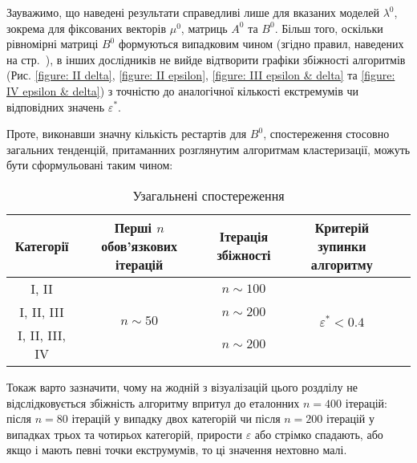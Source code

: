 Зауважимо, що наведені результати справедливі лише для вказаних моделей $\lambda^0$, зокрема для фіксованих векторів $\mu^0$, матриць $A^0$ та $B^0$. Більш того, оскільки рівномірні матриці $B^0$ формуються випадковим чином (згідно правил, наведених на стр.~\pageref{section: II classes}), в інших дослідників не вийде відтворити графіки збіжності алгоритмів (Рис. \ref{figure: II delta}, \ref{figure: II epsilon}, \ref{figure: III epsilon & delta} та \ref{figure: IV epsilon & delta}) з точністю до аналогічної кількості екстремумів чи  відповідних значень $\varepsilon^*$.

Проте, виконавши значну кількість рестартів для $B^0$, спостереження стосовно загальних тенденцій, притаманних розглянутим алгоритмам кластеризації, можуть бути сформульовані таким чином:

\vspace{0.4cm}
\begin{table}[H]
    \begin{center}
        \begin{tabular}{||c|c|c|c|c||}
            \hline
            Категорії &  
            \parbox{4cm}{\centering Перші $n$ обов'язкових ітерацій} & 
            \parbox{4cm}{\centering Ітерація збіжності} & 
            \parbox{2.8cm}{\vspace{0.3cm}\centering Критерій зупинки алгоритму \vspace{0.2cm}} \\
            \hline
            I, II 
                &  
                & $n\sim 100$
                &  \\
            I, II, III 
                & 
                & $n\sim 200$
                & \\
            I, II, III, IV 
                & 
                & $n\sim 200$
                & \\
            \hline
        \end{tabular}
    \end{center}
    \caption{Узагальнені спостереження}
    \label{table: main results}
\end{table}

Токаж варто зазначити, чому на жодній з візуалізацій цього роздлілу не відслідковується збіжність алгоритму впритул до еталонних $n=400$ ітерацій: після $n=80$ ітерацій у випадку двох категорій чи після $n=200$ ітерацій у випадках трьох та чотирьох категорій, прирости $\varepsilon$ або стрімко спадають, або якщо і мають певні точки екструмумів, то ці значення нехтовно малі.

